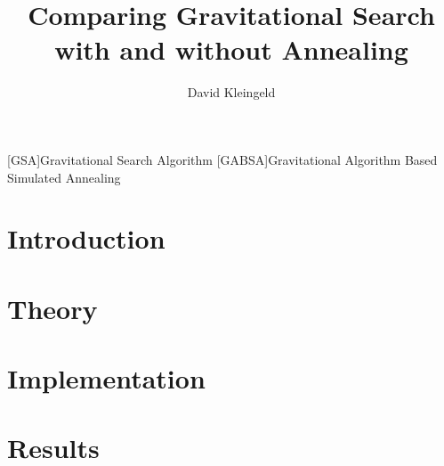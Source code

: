 \documentclass[lang=en, hanging-titles=true]{skrapport}
\title{Comparing Gravitational Search with and without Annealing}
\author[dskleingeld@gmail.com]{David Kleingeld}
\begin{document}
\maketitle
\tableofcontents

\begin{acronym}
[GSA]{Gravitational Search Algorithm}
[GABSA]{Gravitational Algorithm Based Simulated Annealing}
\end{acronym}

\section{Introduction}

\section{Theory}

\section{Implementation}

\section{Results}

%

\clearpage
\appendix
%
\printbibliography
\end{document}
